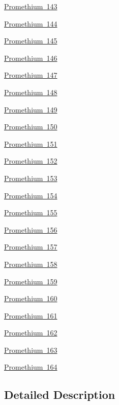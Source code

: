 \begin{DoxyCompactItemize}
\item 
\mbox{\hyperlink{group___isotope_const-_promethium-_pm143}{Promethium 143}}
\item 
\mbox{\hyperlink{group___isotope_const-_promethium-_pm144}{Promethium 144}}
\item 
\mbox{\hyperlink{group___isotope_const-_promethium-_pm145}{Promethium 145}}
\item 
\mbox{\hyperlink{group___isotope_const-_promethium-_pm146}{Promethium 146}}
\item 
\mbox{\hyperlink{group___isotope_const-_promethium-_pm147}{Promethium 147}}
\item 
\mbox{\hyperlink{group___isotope_const-_promethium-_pm148}{Promethium 148}}
\item 
\mbox{\hyperlink{group___isotope_const-_promethium-_pm149}{Promethium 149}}
\item 
\mbox{\hyperlink{group___isotope_const-_promethium-_pm150}{Promethium 150}}
\item 
\mbox{\hyperlink{group___isotope_const-_promethium-_pm151}{Promethium 151}}
\item 
\mbox{\hyperlink{group___isotope_const-_promethium-_pm152}{Promethium 152}}
\item 
\mbox{\hyperlink{group___isotope_const-_promethium-_pm153}{Promethium 153}}
\item 
\mbox{\hyperlink{group___isotope_const-_promethium-_pm154}{Promethium 154}}
\item 
\mbox{\hyperlink{group___isotope_const-_promethium-_pm155}{Promethium 155}}
\item 
\mbox{\hyperlink{group___isotope_const-_promethium-_pm156}{Promethium 156}}
\item 
\mbox{\hyperlink{group___isotope_const-_promethium-_pm157}{Promethium 157}}
\item 
\mbox{\hyperlink{group___isotope_const-_promethium-_pm158}{Promethium 158}}
\item 
\mbox{\hyperlink{group___isotope_const-_promethium-_pm159}{Promethium 159}}
\item 
\mbox{\hyperlink{group___isotope_const-_promethium-_pm160}{Promethium 160}}
\item 
\mbox{\hyperlink{group___isotope_const-_promethium-_pm161}{Promethium 161}}
\item 
\mbox{\hyperlink{group___isotope_const-_promethium-_pm162}{Promethium 162}}
\item 
\mbox{\hyperlink{group___isotope_const-_promethium-_pm163}{Promethium 163}}
\item 
\mbox{\hyperlink{group___isotope_const-_promethium-_pm164}{Promethium 164}}
\end{DoxyCompactItemize}


\subsection{Detailed Description}

